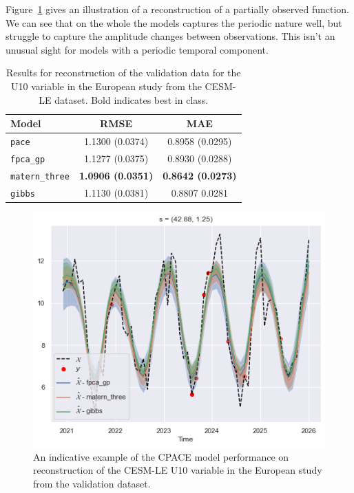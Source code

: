 Figure~\ref{fig:train_ex_u10_eur} gives an illustration of a reconstruction of a partially observed function.
We can see that on the whole the models captures the periodic nature well, but struggle to capture the amplitude changes between observations.
This isn't an unusual sight for models with a periodic temporal component.
 
\begin{table}
	\caption[Results for U10 variable on validation data in the European study]{Results for reconstruction of the validation data for the U10 variable in the European study from the CESM-LE dataset. Bold indicates best in class.}
	\centering
	\label{tab:train_cesm_u10_eur}
	\begin{tabular}{lcc}
		\toprule
		\textbf{Model} & \textbf{RMSE} & \textbf{MAE} \\
		\midrule
		\verb*|pace| & 1.1300 (0.0374) & 0.8958	(0.0295) \\
		\verb*|fpca_gp| & 1.1277 (0.0375) & 0.8930 (0.0288) \\
		\verb*|matern_three| & \textbf{1.0906 (0.0351)} & \textbf{0.8642 (0.0273)}\\
		\verb*|gibbs| & 1.1130 (0.0381) & 0.8807	0.0281\\
		\bottomrule
	\end{tabular}
\end{table}

\begin{figure}
	\centering
	\includegraphics[width=\textwidth]{train_ex_u10_eur}
	\caption[An indicative example of the CPACE model performance on reconstruction of the CESM-LE U10 variable in the European study from the validation dataset.]{An indicative example of the CPACE model performance on reconstruction of the CESM-LE U10 variable in the European study from the validation dataset.}
	\label{fig:train_ex_u10_eur}
\end{figure}

